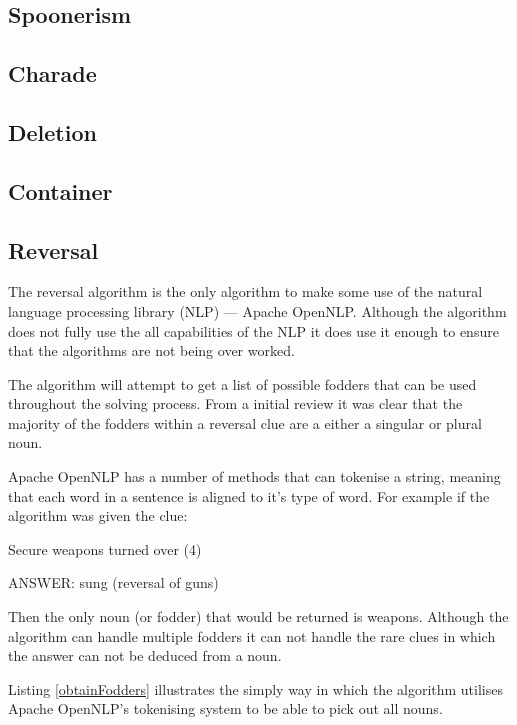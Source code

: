 \subsection{Spoonerism}

\subsection{Charade}

\subsection{Deletion}

\subsection{Container}

\subsection{Reversal}

The reversal algorithm is the only algorithm to make some use of the natural 
language processing library (NLP) --- Apache OpenNLP. Although the algorithm 
does not fully use the all capabilities of the NLP it does use it enough to 
ensure that the algorithms are not being over worked.

The algorithm will attempt to get a list of possible fodders that can be used 
throughout the solving process. From a initial review it was clear that the 
majority of the fodders within a reversal clue are a either a singular or plural
noun.

Apache OpenNLP has a number of methods that can tokenise a string, meaning that 
each word in a sentence is aligned to it's type of word. For example if the 
algorithm was given the clue:

Secure weapons turned over (4)

ANSWER: sung (reversal of guns)

Then the only noun (or fodder) that would be returned is weapons. Although the 
algorithm can handle multiple fodders it can not handle the rare clues in which
the answer can not be deduced from a noun.

Listing \ref{obtainFodders} illustrates the simply way in which the algorithm 
utilises Apache OpenNLP's tokenising system to be able to pick out all nouns.

